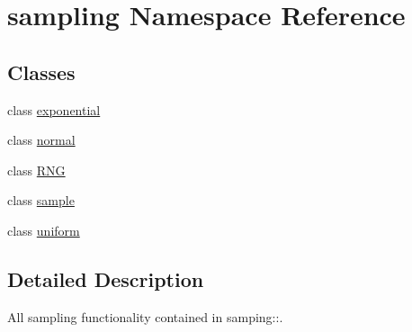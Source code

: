 \hypertarget{namespacesampling}{}\section{sampling Namespace Reference}
\label{namespacesampling}
\subsection*{Classes}
\begin{DoxyCompactItemize}
\item 
class \hyperlink{classsampling_1_1exponential}{exponential}
\item 
class \hyperlink{classsampling_1_1normal}{normal}
\item 
class \hyperlink{classsampling_1_1RNG}{R\+NG}
\item 
class \hyperlink{classsampling_1_1sample}{sample}
\item 
class \hyperlink{classsampling_1_1uniform}{uniform}
\end{DoxyCompactItemize}


\subsection{Detailed Description}
All sampling functionality contained in {\ttfamily samping\+:\+:}. 